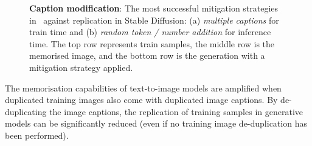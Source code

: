 \documentclass[conference,table]{IEEEtran}
\begin{document}
\begin{figure}
    \centering
    \hfill
    \caption{\textbf{Caption modification}: The most successful mitigation strategies in~\cite{somepalli_understanding_2023} against replication in Stable Diffusion: (a) \textit{multiple captions} for train time and (b) \textit{random token / number addition} for inference time. The top row represents train samples, the middle row is the memorised image, and the bottom row is the generation with a mitigation strategy applied.}
    \label{fig:caption-modification}
\end{figure}


The memorisation capabilities of text-to-image models are amplified when duplicated training images also come with duplicated image captions. 
By de-duplicating the image captions, the replication of training samples in generative models can be significantly reduced (even if no training image de-duplication has been performed). 
\end{document}
